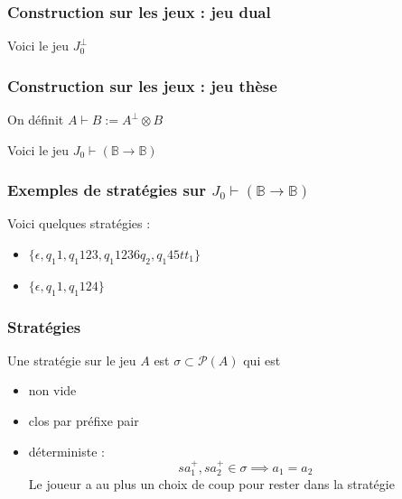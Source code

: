 \documentclass{beamer}
\begin{document}
\begin{frame}
\frametitle{Construction sur les jeux : jeu dual}

Voici le jeu $J_0^\bot$


\end{frame}

\begin{frame}
\frametitle{Construction sur les jeux : jeu thèse}

On définit $A\vdash B := A^\bot \otimes B$

Voici le jeu $J_0\vdash (\mathbb{B} \rightarrow \mathbb{B})$

 
\end{frame}

\begin{frame}
\frametitle{Exemples de stratégies sur $J_0\vdash  (\mathbb{B} \rightarrow \mathbb{B})$}

 

Voici quelques stratégies :
\begin{itemize}
\item $\{\epsilon, q_1 1, q_1 1 2 3, q_1 1 2 3 6 q_2, q_1 4 5 tt_1\}$
\pause
\item $\{\epsilon,q_1 1, q_1 1 2 4\}$
\end{itemize}

\end{frame}

\begin{frame}
\frametitle{Stratégies}


Une stratégie sur le jeu $A$ est $\sigma \subset \mathcal{P}(A)$ qui est
\begin{itemize}
\item non vide
\item clos par préfixe pair
\item déterministe :
\begin{equation*} sa_1^+, sa_2^+ \in \sigma \implies a_1 = a_2 \end{equation*}
Le joueur a au plus un choix de coup pour rester dans la stratégie

\end{itemize}

\end{frame}
\end{document}
